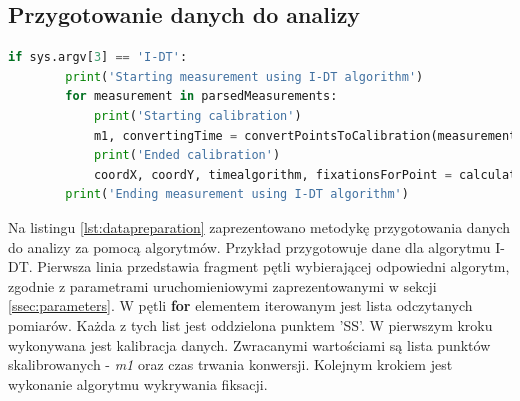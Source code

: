 \subsection{Przygotowanie danych do analizy}
\label{ssec:Dataanalysis}
\begin{lstlisting}[language=Python, caption=Przygotowanie danych do dalszej analizy, label={lst:datapreparation}]
        if sys.argv[3] == 'I-DT':
        print('Starting measurement using I-DT algorithm')
        for measurement in parsedMeasurements:
            print('Starting calibration')
            m1, convertingTime = convertPointsToCalibration(measurement)
            print('Ended calibration')
            coordX, coordY, timealgorithm, fixationsForPoint = calculateIdtAlgorithm(m1)
        print('Ending measurement using I-DT algorithm')
\end{lstlisting}
Na listingu \ref{lst:datapreparation} zaprezentowano metodykę przygotowania danych do analizy za pomocą algorytmów. Przykład przygotowuje dane dla algorytmu I-DT. Pierwsza linia przedstawia fragment pętli wybierającej odpowiedni algorytm, zgodnie z parametrami uruchomieniowymi zaprezentowanymi w sekcji \ref{ssec:parameters}. W pętli \textbf{for} elementem iterowanym jest lista odczytanych pomiarów. Każda z tych list jest oddzielona punktem 'SS'. W pierwszym kroku wykonywana jest kalibracja danych. Zwracanymi wartościami są lista punktów skalibrowanych - \emph{m1} oraz czas trwania konwersji. Kolejnym krokiem jest wykonanie algorytmu wykrywania fiksacji.
